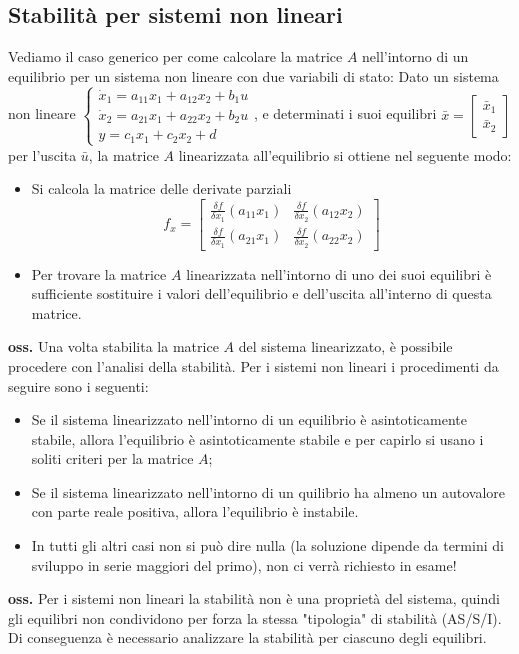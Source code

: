 \subsection{Stabilità per sistemi non lineari}
Vediamo il caso generico per come calcolare la matrice $A$ nell'intorno di un equilibrio per un sistema non lineare con due variabili di stato:\newline
\newline
Dato un sistema non lineare $\begin{cases}
    \dot{x}_1 = a_{11}x_1 + a_{12}x_2 + b_{1}u\\ 
    \dot{x}_2 = a_{21}x_1 + a_{22}x_2 +b_2u\\
    y = c_1x_1 + c_2x_2 + d
\end{cases}$, e determinati i suoi equilibri $\bar{x} = \left[\begin{matrix}
    \bar{x}_1\\\bar{x}_2
\end{matrix}\right]$ per l'uscita $\bar{u}$, la matrice $A$ linearizzata all'equilibrio si ottiene nel seguente modo:
\begin{itemize}
    \item Si calcola la matrice delle derivate parziali
    \[
        f_x = \left[\begin{matrix}
            \frac{\delta f}{\delta x_1} (a_{11}x_1) & \frac{\delta f}{\delta x_2} (a_{12}x_2)\\
            \frac{\delta f}{\delta x_1} (a_{21}x_1) & \frac{\delta f}{\delta x_2} (a_{22}x_2)
        \end{matrix}\right]
    \]
    \item Per trovare la matrice $A$ linearizzata nell'intorno di uno dei suoi equilibri è sufficiente sostituire i valori dell'equilibrio e dell'uscita all'interno di questa matrice.
\end{itemize}
\textbf{oss.} Una volta stabilita la matrice $A$ del sistema linearizzato, è possibile procedere con l'analisi della stabilità. Per i sistemi non lineari i procedimenti da seguire sono i seguenti:
\begin{itemize}
    \item Se il sistema linearizzato nell'intorno di un equilibrio è asintoticamente stabile, allora l'equilibrio è asintoticamente stabile e per capirlo si usano i soliti criteri per la matrice $A$;
    \item Se il sistema linearizzato nell'intorno di un quilibrio ha almeno un autovalore con parte reale positiva, allora l'equilibrio è instabile.
    \item In tutti gli altri casi non si può dire nulla (la soluzione dipende da termini di sviluppo in serie maggiori del primo), non ci verrà richiesto in esame!
\end{itemize}
\textbf{oss.} Per i sistemi non lineari la stabilità non è una proprietà del sistema, quindi gli equilibri non condividono per forza la stessa "tipologia" di stabilità (AS/S/I). Di conseguenza è necessario analizzare la stabilità per ciascuno degli equilibri.
